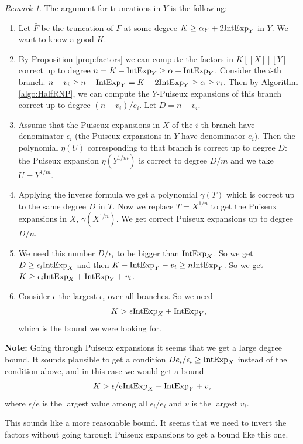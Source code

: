 \documentclass[a4paper,11pt,reqno]{amsart}%
\theoremstyle{definition}
\theoremstyle{plain}
\theoremstyle{remark}
\newtheorem{remark}[defn]{Remark}
\newcommand\ct[1]{\text{\rmfamily\upshape #1}}
\newcommand{\IntExpX}{\ct{IntExp}_X}
\newcommand{\IntExpY}{\ct{IntExp}_Y}
\begin{document}
\begin{remark}
The argument for truncations in $Y$ is the following:
\begin{enumerate}
\item Let $\bar F$ be the truncation of $F$ at some degree $K \ge \alpha_Y + 2 \IntExpY$ in $Y$. We want to know a good $K$.
\item By Proposition \ref{prop:factors} we can compute the factors in $K[[X]][Y]$ correct up to degree $n = K - \IntExpY \ge \alpha + \IntExpY$. Consider the $i$-th branch. $n - v_i \ge n - \IntExpY = K - 2 \IntExpY \ge \alpha \ge r_i$. Then by Algorithm \ref{algo:HalfRNP}, we can compute the $Y$-Puiseux expansions of this branch correct up to degree $(n - v_i) / e_i$. Let $D = n - v_i$.
\item Assume that the Puiseux expansions in $X$ of the $i$-th branch have denominator $\epsilon_i$ (the Puiseux expansions in $Y$ have denominator $e_i$). Then the polynomial $\eta(U)$ corresponding to that branch is correct up to degree $D$: the Puiseux expansion $\eta(Y^{1/m})$ is correct to degree $D/m$ and we take $U = Y^{1/m}$.
\item Applying the inverse formula we get a polynomial $\gamma(T)$ which is correct up to the same degree $D$ in $T$. Now we replace $T = X^{1/n}$ to get the Puiseux expansions in $X$, $\gamma(X^{1/n})$. We get correct Puiseux expansions up to degree $D/n$.
\item We need this number $D/\epsilon_i$ to be bigger than $\IntExpX$. So we get $D \ge \epsilon_i\IntExpX$ and then $K - \IntExpY - v_i \ge n \IntExpY$. So we get $K \ge \epsilon_i\IntExpX + \IntExpY + v_i$.

\item Consider $\epsilon$ the largest $\epsilon_i$ over all branches. So we need 
$$K > \epsilon \IntExpX + \IntExpY,$$
which is the bound we were looking for.
 
\end{enumerate}

\textbf{Note:} Going through Puiseux expansions it seems that we get a large degree bound. 
It sounds plausible to get a condition $D e_i / \epsilon_i \ge \IntExpX$ instead of the condition above, and in this case we would get a bound
$$K > \epsilon/e \IntExpX + \IntExpY + v,$$
where $\epsilon/e$ is the largest value among all $\epsilon_i / e_i$ and $v$ is the largest $v_i$. 

This sounds like a more reasonable bound. It seems that we need to invert the factors without going through Puiseux expansions to get a bound like this one.


\end{remark}
\end{document}
